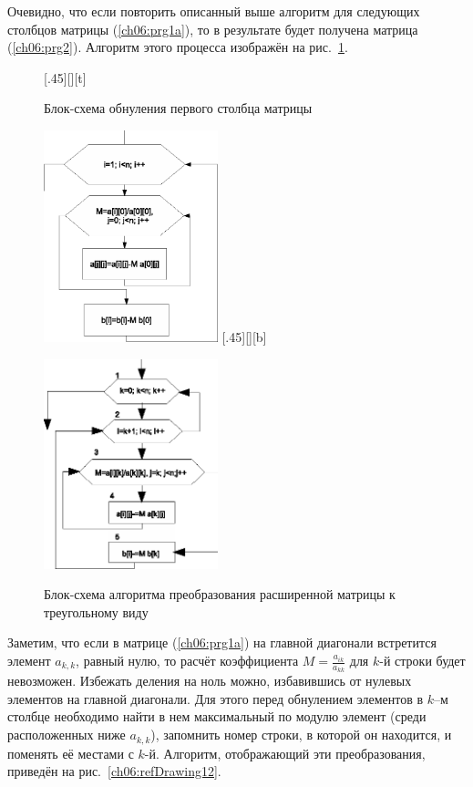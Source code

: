Очевидно, что если повторить описанный выше алгоритм для следующих столбцов матрицы (\ref{ch06:prg1a}), 
то в результате будет получена
матрица (\ref{ch06:prg2}). Алгоритм этого процесса изображён на рис.~\ref{ch06:refDrawing11}.
{\small
\begin{figure}[h]
\begin{floatrow}
[.45\textwidth][\FBheight][t]
{\caption{Блок-схема обнуления первого столбца матрицы}
\label{ch06:refDrawing10}}
{\includegraphics[width=0.45\textwidth,keepaspectratio]{img/ris_6_11}}\hspace*{0.05\textwidth}
%
[.45\textwidth][\FBheight][b]
{\caption{Блок-схема алгоритма преобразования расширенной матрицы к треугольному виду}
\label{ch06:refDrawing11}}
{\includegraphics[width=0.45\textwidth,keepaspectratio]{img/ris_6_12}}
\end{floatrow}
\end{figure}
}

Заметим, что если в матрице (\ref{ch06:prg1a}) на главной диагонали встретится элемент  $a_{k,k}$, равный нулю, то
расчёт коэффициента $M=\frac{a_{ik}}{a_{kk}}$  для $k$-й строки будет невозможен. Избежать деления на
ноль можно, избавившись от нулевых элементов на главной диагонали. Для этого перед обнулением элементов в $k$–м столбце
необходимо найти в нем максимальный по модулю элемент (среди расположенных ниже  $a_{k,k}$), запомнить номер строки, в
которой он находится, и поменять её местами с $k$-й. Алгоритм, отображающий эти преобразования, приведён 
на рис.~\ref{ch06:refDrawing12}.

